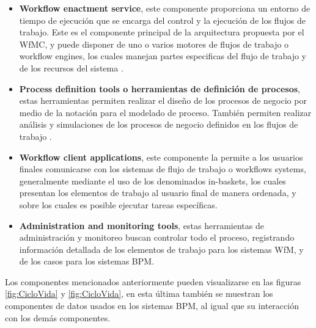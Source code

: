 \begin{itemize}
    \item \textbf{Workflow enactment service}, este componente proporciona un entorno de tiempo de ejecución que se encarga del control y la ejecución de los flujos de trabajo. Este es el componente principal de la arquitectura propuesta por el WfMC,  y puede disponer de uno o varios motores de flujos de trabajo o workflow engines, los cuales manejan partes especificas del flujo de trabajo y de los recursos del sistema \cite{VanderAalst2013}. 
    
    \item \textbf{Process definition tools o herramientas de definición de procesos}, estas herramientas permiten realizar el diseño de los procesos de negocio por medio de la notación para el modelado de proceso. También permiten realizar análisis y simulaciones de los procesos de negocio definidos en los flujos de trabajo \cite{VanderAalst2013}. 
    
    \item \textbf{Workflow client applications}, este componente la permite a los usuarios finales comunicarse con los sistemas de flujo de trabajo o workflows systems, generalmente mediante el uso de los denominados in-baskets, los cuales presentan los elementos de trabajo al usuario final de manera ordenada, y sobre los cuales es posible ejecutar tareas específicas.
    
    \item \textbf{Administration and monitoring tools}, estas herramientas de administración y monitoreo buscan controlar todo el proceso, registrando información detallada de los elementos de trabajo para los sistemas WfM, y de los casos para los sistemas BPM.
    
\end{itemize}

Los componentes mencionados anteriormente pueden visualizarse en las figuras \ref{fig:CicloVida} y \ref{fig:CicloVida}, en esta última también se muestran los componentes de datos usados en los sistemas BPM, al igual que su interacción con los demás componentes.

